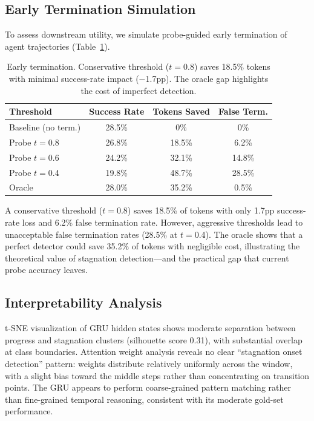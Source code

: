 \documentclass[11pt,a4paper]{article}
\begin{document}
\subsection{Early Termination Simulation}

To assess downstream utility, we simulate probe-guided early termination of agent trajectories (Table~\ref{tab:early-term}).

\begin{table}[t]
\centering
\small
\begin{tabular}{lccc}
\toprule
\textbf{Threshold} & \textbf{Success Rate} & \textbf{Tokens Saved} & \textbf{False Term.} \\
\midrule
Baseline (no term.) & 28.5\% & 0\% & 0\% \\
Probe $t{=}$0.8 & 26.8\% & 18.5\% & 6.2\% \\
Probe $t{=}$0.6 & 24.2\% & 32.1\% & 14.8\% \\
Probe $t{=}$0.4 & 19.8\% & 48.7\% & 28.5\% \\
Oracle & 28.0\% & 35.2\% & 0.5\% \\
\bottomrule
\end{tabular}
\caption{Early termination. Conservative threshold ($t{=}$0.8) saves 18.5\% tokens with minimal success-rate impact ($-$1.7pp). The oracle gap highlights the cost of imperfect detection.}
\label{tab:early-term}
\end{table}

A conservative threshold ($t{=}$0.8) saves 18.5\% of tokens with only 1.7pp success-rate loss and 6.2\% false termination rate.
However, aggressive thresholds lead to unacceptable false termination rates (28.5\% at $t{=}$0.4).
The oracle shows that a perfect detector could save 35.2\% of tokens with negligible cost, illustrating the theoretical value of stagnation detection---and the practical gap that current probe accuracy leaves.

\subsection{Interpretability Analysis}

t-SNE visualization of GRU hidden states shows moderate separation between progress and stagnation clusters (silhouette score 0.31), with substantial overlap at class boundaries.
Attention weight analysis reveals no clear ``stagnation onset detection'' pattern: weights distribute relatively uniformly across the window, with a slight bias toward the middle steps rather than concentrating on transition points.
The GRU appears to perform coarse-grained pattern matching rather than fine-grained temporal reasoning, consistent with its moderate gold-set performance.
\end{document}
